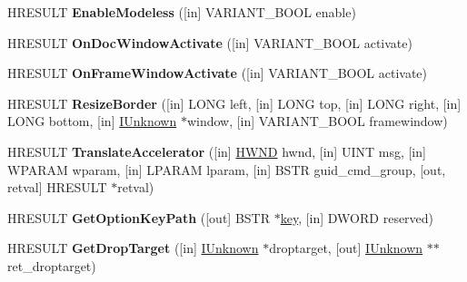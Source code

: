 \begin{DoxyCompactItemize}
H\+R\+E\+S\+U\+LT {\bfseries Enable\+Modeless} (\mbox{[}in\mbox{]} V\+A\+R\+I\+A\+N\+T\+\_\+\+B\+O\+OL enable)
\item 
\mbox{\label{interface_i_doc_host_u_i_handler_dispatch_ac25c25876f0c2ec4e32ae8ed11e71fd1}} 
H\+R\+E\+S\+U\+LT {\bfseries On\+Doc\+Window\+Activate} (\mbox{[}in\mbox{]} V\+A\+R\+I\+A\+N\+T\+\_\+\+B\+O\+OL activate)
\item 
\mbox{\label{interface_i_doc_host_u_i_handler_dispatch_a31213fe016af4e21f7631687335d961a}} 
H\+R\+E\+S\+U\+LT {\bfseries On\+Frame\+Window\+Activate} (\mbox{[}in\mbox{]} V\+A\+R\+I\+A\+N\+T\+\_\+\+B\+O\+OL activate)
\item 
\mbox{\label{interface_i_doc_host_u_i_handler_dispatch_aa31c0d437ebd280e373982038705c343}} 
H\+R\+E\+S\+U\+LT {\bfseries Resize\+Border} (\mbox{[}in\mbox{]} L\+O\+NG left, \mbox{[}in\mbox{]} L\+O\+NG top, \mbox{[}in\mbox{]} L\+O\+NG right, \mbox{[}in\mbox{]} L\+O\+NG bottom, \mbox{[}in\mbox{]} \hyperlink{interface_i_unknown}{I\+Unknown} $\ast$window, \mbox{[}in\mbox{]} V\+A\+R\+I\+A\+N\+T\+\_\+\+B\+O\+OL framewindow)
\item 
\mbox{\label{interface_i_doc_host_u_i_handler_dispatch_a5610fbb65690098793ff30134c83db0d}} 
H\+R\+E\+S\+U\+LT {\bfseries Translate\+Accelerator} (\mbox{[}in\mbox{]} \hyperlink{interfacevoid}{H\+W\+ND} hwnd, \mbox{[}in\mbox{]} U\+I\+NT msg, \mbox{[}in\mbox{]} W\+P\+A\+R\+AM wparam, \mbox{[}in\mbox{]} L\+P\+A\+R\+AM lparam, \mbox{[}in\mbox{]} B\+S\+TR guid\+\_\+cmd\+\_\+group, \mbox{[}out, retval\mbox{]} H\+R\+E\+S\+U\+LT $\ast$retval)
\item 
\mbox{\label{interface_i_doc_host_u_i_handler_dispatch_a2cd77dcb4861a4d51f93aff03e7cf572}} 
H\+R\+E\+S\+U\+LT {\bfseries Get\+Option\+Key\+Path} (\mbox{[}out\mbox{]} B\+S\+TR $\ast$\hyperlink{structkey}{key}, \mbox{[}in\mbox{]} D\+W\+O\+RD reserved)
\item 
\mbox{\label{interface_i_doc_host_u_i_handler_dispatch_a5bd2ed5ff423bcd12c5cbb98afa36b7c}} 
H\+R\+E\+S\+U\+LT {\bfseries Get\+Drop\+Target} (\mbox{[}in\mbox{]} \hyperlink{interface_i_unknown}{I\+Unknown} $\ast$droptarget, \mbox{[}out\mbox{]} \hyperlink{interface_i_unknown}{I\+Unknown} $\ast$$\ast$ret\+\_\+droptarget)
$$
\end{DoxyCompactItemize}
